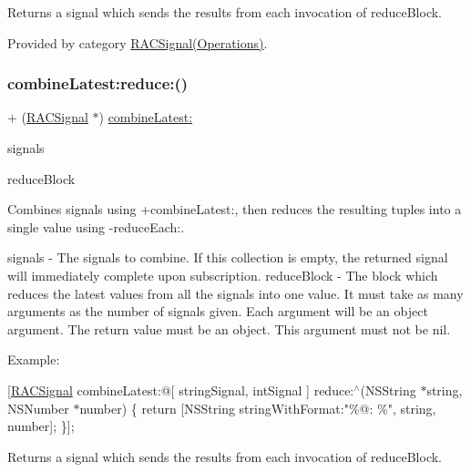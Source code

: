 Returns a signal which sends the results from each invocation of {\ttfamily reduce\+Block}. 

Provided by category \mbox{\hyperlink{category_r_a_c_signal_07_operations_08_a5e4d2db914a14c415646d9fdda131221}{R\+A\+C\+Signal(\+Operations)}}.

\mbox{\label{interface_r_a_c_signal_a5e4d2db914a14c415646d9fdda131221}} 
\subsubsection{\texorpdfstring{combine\+Latest\+:reduce\+:()}{combineLatest:reduce:()}\hspace{0.1cm}{\footnotesize\ttfamily [3/3]}}
{\footnotesize\ttfamily + (\mbox{\hyperlink{interface_r_a_c_signal}{R\+A\+C\+Signal}} $\ast$) \mbox{\hyperlink{category_r_a_c_signal_07_operations_08_a8a7a563a48665fb1203e2b37db6e5e98}{combine\+Latest\+:}} \begin{DoxyParamCaption}\item[{(id$<$ N\+S\+Fast\+Enumeration $>$)}]{signals }\item[{reduce:(id($^\wedge$)())}]{reduce\+Block }\end{DoxyParamCaption}}

Combines signals using +combine\+Latest\+:, then reduces the resulting tuples into a single value using -\/reduce\+Each\+:.

signals -\/ The signals to combine. If this collection is empty, the returned signal will immediately complete upon subscription. reduce\+Block -\/ The block which reduces the latest values from all the signals into one value. It must take as many arguments as the number of signals given. Each argument will be an object argument. The return value must be an object. This argument must not be nil.

Example\+:

\mbox{[}\mbox{\hyperlink{interface_r_a_c_signal}{R\+A\+C\+Signal}} combine\+Latest\+:@\mbox{[} string\+Signal, int\+Signal \mbox{]} reduce\+:$^\wedge$(N\+S\+String $\ast$string, N\+S\+Number $\ast$number) \{ return \mbox{[}N\+S\+String string\+With\+Format\+:"\%@\+: \%", string, number\mbox{]}; \}\mbox{]};

Returns a signal which sends the results from each invocation of {\ttfamily reduce\+Block}. 

